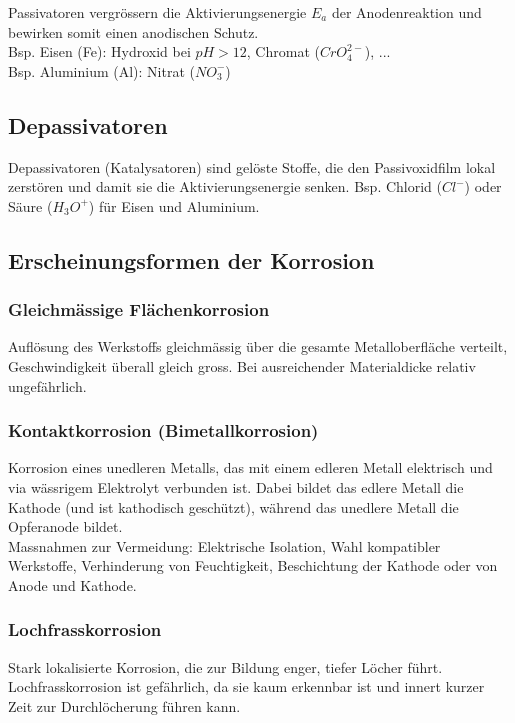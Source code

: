 Passivatoren vergrössern die Aktivierungsenergie $E_a$ der Anodenreaktion und bewirken somit einen anodischen Schutz. \\

Bsp. Eisen (Fe): Hydroxid bei $pH>12$, Chromat ($CrO_4^{2-}$),  ... \\
Bsp. Aluminium (Al): Nitrat ($NO_3^-$) \\

\subsection{Depassivatoren}
Depassivatoren (Katalysatoren) sind gelöste Stoffe, die den Passivoxidfilm lokal zerstören und damit sie die Aktivierungsenergie senken. Bsp. Chlorid ($Cl^-$) oder Säure ($H_3O^+$) für Eisen und Aluminium.

\subsection{Erscheinungsformen der Korrosion}

\subsubsection{Gleichmässige Flächenkorrosion}
Auflösung des Werkstoffs gleichmässig über die gesamte Metalloberfläche verteilt, Geschwindigkeit überall gleich gross. Bei ausreichender Materialdicke relativ ungefährlich.

\subsubsection{Kontaktkorrosion (Bimetallkorrosion)}
Korrosion eines unedleren Metalls, das mit einem edleren Metall elektrisch und via wässrigem Elektrolyt verbunden ist. Dabei bildet das edlere Metall die Kathode (und ist kathodisch geschützt), während das unedlere Metall die Opferanode bildet. \\

Massnahmen zur Vermeidung: Elektrische Isolation, Wahl kompatibler Werkstoffe, Verhinderung von Feuchtigkeit, Beschichtung der Kathode oder von Anode und Kathode. \\

\subsubsection{Lochfrasskorrosion}
Stark lokalisierte Korrosion, die zur Bildung enger, tiefer Löcher führt. Lochfrasskorrosion ist gefährlich, da sie kaum erkennbar ist und innert kurzer Zeit zur Durchlöcherung führen kann.

